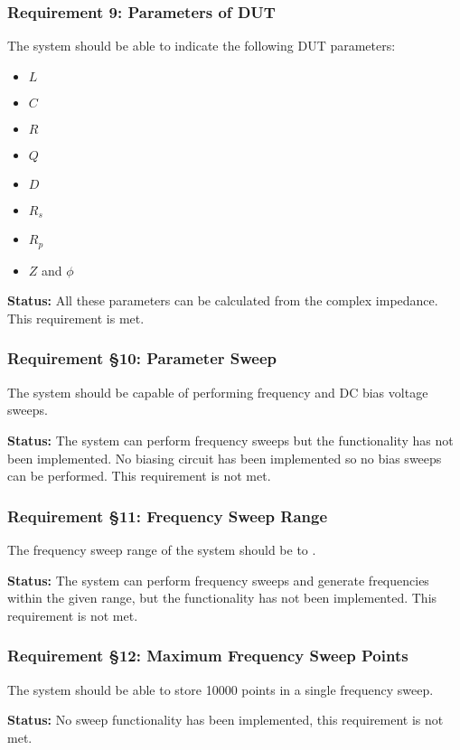 \subsubsection*{Requirement 9: Parameters of DUT}
The system should be able to indicate the following DUT parameters:
\begin{itemize}
    \item $L$
    \item $C$
    \item $R$
    \item $Q$
    \item $D$
    \item $R_s$
    \item $R_p$
    \item $Z$ and $\phi$
\end{itemize}

\textbf{Status:} All these parameters can be calculated from the complex impedance. This requirement is met.
\nl
\nl

\subsubsection*{Requirement §10: Parameter Sweep}
The system should be capable of performing frequency and DC bias voltage sweeps.

\textbf{Status:} The system can perform frequency sweeps but the functionality has not been implemented. No biasing circuit has been implemented so no bias sweeps can be performed. This requirement is not met.
\nl
\nl

\subsubsection*{Requirement §11: Frequency Sweep Range}
The frequency sweep range of the system should be  to .

\textbf{Status:} The system can perform frequency sweeps and generate frequencies within the given range, but the functionality has not been implemented. This requirement is not met.
\nl
\nl

\subsubsection*{Requirement §12: Maximum Frequency Sweep Points}
The system should be able to store 10000 points in a single frequency sweep.

\textbf{Status:} No sweep functionality has been implemented, this requirement is not met.
\nl
\nl

